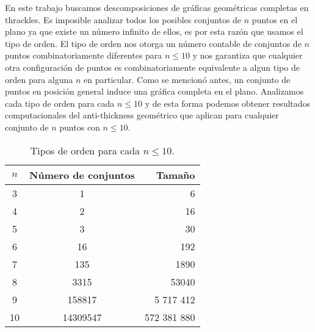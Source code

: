En este trabajo buscamos descomposiciones de gráficas
geométricas completas en thrackles. Es imposible analizar todos los posibles conjuntos de $n$ puntos en el plano
ya que existe un número infinito de ellos, es por esta razón que usamos el tipo de orden.
El tipo de orden nos otorga un número contable de conjuntos de $n$ puntos combinatoriamente diferentes
para $n\leq 10$ y nos garantiza que cualquier otra configuración de puntos es combinatoriamente equivalente
a algun tipo de orden para alguna $n$ en particular. Como se mencionó antes, un conjunto de puntos en posición general
induce una gráfica completa en el plano. Analizamos cada tipo de orden para cada $n\leq 10$
y de esta forma podemos obtener resultados computacionales del anti-thickness geométrico
que aplican para cualquier conjunto de $n$ puntos con $n\leq 10$.
\begin{table}[ht]
  \centering
  \begin{tabular}{|c|c|r|}
  \hline
  $n$ & Número de conjuntos & Tamaño    \\ \hline
  3     & 1                   & 6       \\ \hline
  4     & 2                   & 16      \\ \hline
  5     & 3                   & 30      \\ \hline
  6     & 16                  & 192     \\ \hline
  7     & 135                 & 1890    \\ \hline
  8     & 3315                & 53040   \\ \hline
  9     & 158817              &	5 717 412   \\\hline
  10    & 14309547            & 572 381 880 \\ \hline
  \end{tabular}
  \caption{Tipos de orden para cada $n\leq10$.}
  \label{tab:ots}
\end{table}

